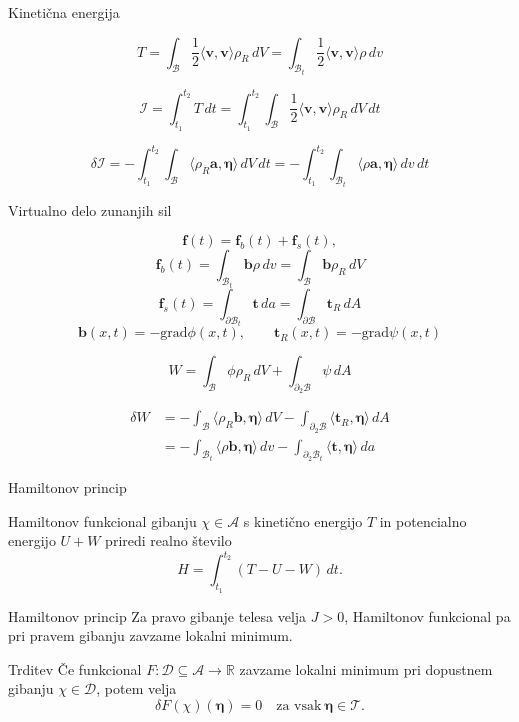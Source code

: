 \documentclass{beamer}
\newcommand{\R}{\mathbb R} %
\newcommand{\B}{\mathcal B} %
\newcommand{\vek}[1]{\boldsymbol #1} %
\newcommand{\grad}{\mathrm{grad}} %
\begin{document}
\begin{frame}{Kinetična energija}

\begin{equation*}
	T = \int_{\B}\frac{1}{2}\langle\vek{v},\vek{v}\rangle\rho_R\, dV =
	\int_{\B_t}\frac{1}{2}\langle\vek{v},\vek{v}\rangle\rho\, dv
\end{equation*}

\[
	\mathcal{I}=\int_{t_1}^{t_2} T\,dt=\int_{t_1}^{t_2}
	\int_{\B}\frac{1}{2}\langle\vek{v},\vek{v}\rangle\rho_R\, dV \,dt
\]

\begin{equation*}
	\delta \mathcal{I} =
	-\int_{t_1}^{t_2}\int_{\B}\langle\rho_R\vek{a},\vek{\eta}\rangle\, dV\, dt=
	-\int_{t_1}^{t_2}\int_{\B_t}\langle\rho\vek{a},\vek{\eta}\rangle\, dv\, dt
\end{equation*}

\end{frame}


\begin{frame}{Virtualno delo zunanjih sil}

\[
	\vek{f}(t)=\vek{f}_b(t)+\vek{f}_s(t),
\]
\[
	\vek{f}_b(t)=\int_{\B_t}\vek{b}\rho\, dv=\int_{\B}\vek{b}\rho_R\, dV
\]
\[
	\vek{f}_s(t)=\int_{\partial \B_t}\vek{t}\, da=\int_{\partial \B}\vek{t}_R\, dA
\]
\[ \vek{b}(x,t)=-\grad\phi(x,t),\qquad \vek{t}_R(x,t)=-\grad\psi(x,t) \]

\begin{equation*}
	W = \int_{\B}\phi\rho_R\, dV + \int_{\partial_2 \B}\psi\, dA
\end{equation*}

\begin{align*}
	\delta W &= -\int_{\B}\langle\rho_R\vek{b},\vek{\eta}\rangle\, dV
	- \int_{\partial_2 \B}\langle\vek{t}_R,\vek{\eta}\rangle\, dA\\
	&=-\int_{\B_t}\langle\rho\vek{b},\vek{\eta}\rangle\, dv
	- \int_{\partial_2 \B_t}\langle\vek{t},\vek{\eta}\rangle\, da
\end{align*}

\end{frame}


\begin{frame}{Hamiltonov princip}

\begin{block}{Hamiltonov funkcional}
	gibanju $\chi\in \mathcal{A}$ s kinetično energijo $T$ in potencialno
	energijo $U+W$ priredi realno število
	\[
		H=\int_{t_1}^{t_2}(T-U-W)\,dt.
	\]
\end{block}

\begin{block}{Hamiltonov princip}
	Za pravo gibanje telesa velja $J>0$, Hamiltonov funkcional pa pri pravem gibanju
	zavzame lokalni minimum.
\end{block}

\begin{block}{Trditev}
	Če funkcional $F\colon \mathcal{D}\subseteq\mathcal{A}\to\R$ zavzame lokalni minimum pri dopustnem gibanju $\chi\in\mathcal{D}$, potem velja
	\[ \delta F(\chi)(\vek{\eta})=0\quad\textrm{za vsak}\ \vek{\eta}\in\mathcal{T}. \]
\end{block}

\end{frame}
\end{document}
